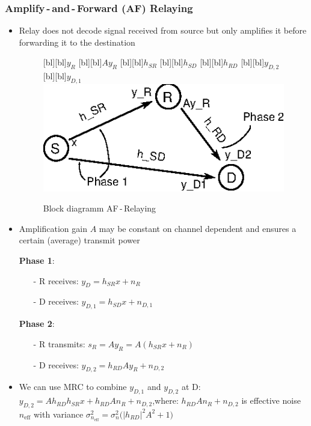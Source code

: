 \documentclass[a4paper, 10pt]{article}
\begin{document}
\subsubsection{Amplify\,-\,and\,-\,Forward (AF) Relaying}
\begin{itemize}
	\item Relay does not decode signal received from source but only amplifies it before forwarding it to the destination
	\begin{figure}[ht]
		\centering
		[bl][bl]{$y_R$}
		[bl][bl]{$Ay_R$}
		[bl][bl]{$h_{SR}$}
		[bl][bl]{$h_{SD}$}
		[bl][bl]{$h_{RD}$}	
		[bl][bl]{$y_{D,2}$}
		[bl][bl]{$y_{D,1}$}
		\includegraphics[scale=1.5]{AF_Relaying}
		\caption{Block diagramm AF\,-\,Relaying}	
		\label{fig:af_relaying}
	\end{figure}
	\item Amplification gain $A $ may be constant on channel dependent and ensures a certain (average) transmit power
	\item[] \textbf{Phase 1}:
	\begin{itemize}
		\item[-] R receives: $y_D = h_{SR}x + n_R $
		\item[-] D receives: $y_{D,1} = h_{SD}x + n_{D,1} $
	\end{itemize}
	\item[] \textbf{Phase 2}:
	\begin{itemize}
		\item[-] R transmits: $s_R = Ay_R = A(h_{SR}x + n_R) $
		\item[-] D receives: $y_{D,2} = h_{RD}Ay_R + n_{D,2} $  
	\end{itemize}
	\item We can use MRC to combine $y_{D,1} $ and $ y_{D,2} $ at D: $ y_{D,2} = Ah_{RD}h_{SR}x + h_{RD}An_R + n_{D,2} $,\quad where: $ h_{RD}An_R + n_{D,2} $ is effective noise $n_{\text{eff}} $ with variance $\sigma_{n_\text{eff}}^2 = \sigma_n^2\bigl(|h_{RD}|^2A^2 + 1\bigr) $

\end{itemize}
\end{document}
